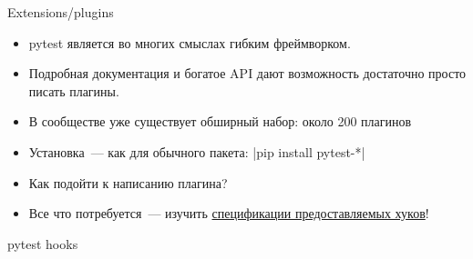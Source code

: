 \documentclass{beamer}
\begin{document}
\begin{frame}[fragile]{Extensions/plugins}
    \begin{itemize}
    \item pytest является во многих смыслах гибким фреймворком.
    \pause \item Подробная документация и богатое API дают возможность достаточно просто писать плагины.
    \pause \item В сообществе уже существует обширный набор: около 200 плагинов
    \pause \item Установка~--- как для обычного пакета: |pip install pytest-*|
    \pause \item Как подойти к написанию плагина?
    \pause \item Все что потребуется~--- изучить \href{http://pytest.org/latest/writing_plugins.html\#pytest-hook-reference}{спецификации предоставляемых хуков}!
    \end{itemize}
\end{frame}

\begin{frame}[fragile]{pytest hooks}
\end{frame}
\end{document}

